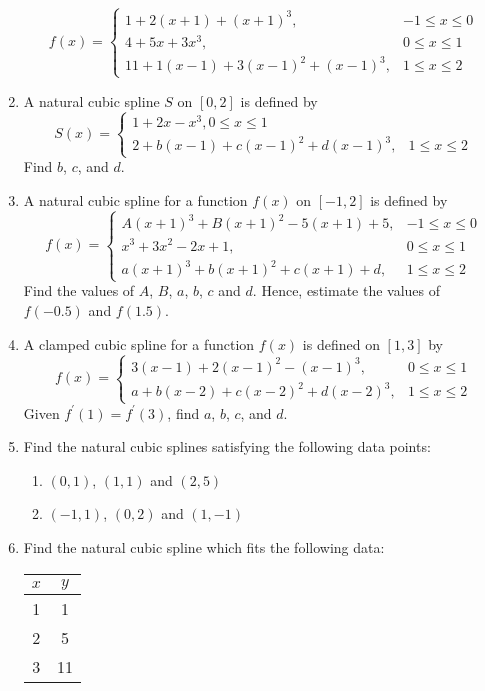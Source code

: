 \documentclass[12pt,class=book,crop=false]{standalone}
\begin{document}
\begin{enumerate}
	\[
		f(x)=\begin{cases}
			1+2(x+1)+(x+1)^3, &-1 \leq x \leq 0\\
			4+5x+3x^3, &0 \leq x \leq 1\\
			11+1(x-1)+3(x-1)^2+(x-1)^3, &1 \leq x \leq 2
		\end{cases}
	\]
	\item A natural cubic spline $ S $ on $ [0, 2] $ is defined by
	\[
		S(x)=\begin{cases}
			1+2x-x^3, 0 \leq x \leq 1\\
			2+b(x-1)+c(x-1)^2+d(x-1)^3, &1 \leq x \leq 2
		\end{cases}
	\]
	Find $ b $, $ c $, and $ d $.
	\item A natural cubic spline for a function $ f(x) $ on $ [-1, 2] $ is defined by
	\[
		f(x)=\begin{cases}
			A(x+1)^3+B(x+1)^2-5(x+1)+5, &-1 \leq x \leq 0\\
			x^3+3x^2-2x+1, &0 \leq x \leq 1\\
			a(x+1)^3+b(x+1)^2+c(x+1)+d, &1 \leq x \leq 2
		\end{cases}
	\]
	Find the values of $ A $, $ B $, $ a $, $ b $, $ c $ and $ d $.
	Hence, estimate the values of $ f(-0.5) $ and $ f(1.5) $.
	\item A clamped cubic spline for a function $ f(x) $ is defined on $ [1, 3] $ by
	\[
		f(x)=\begin{cases}
			3(x-1)+2(x-1)^2-(x-1)^3, &0 \leq x \leq 1\\
			a+b(x-2)+c(x-2)^2+d(x-2)^3,& 1 \leq x \leq 2
		\end{cases}
	\]
	Given $ f^{'}(1)=f^{'}(3) $, find $ a $, $ b $, $ c $, and $ d $.
	\item Find the natural cubic splines satisfying the following data points:
	\begin{enumerate}
		\item $ (0,1) $, $ (1,1) $ and $ (2,5) $
		\item $ (-1,1) $, $ (0,2) $ and $ (1,-1) $
	\end{enumerate}
	\item Find the natural cubic spline which fits the following data:
	\begin{table}[H]
		\centering
		\begin{tabular}{cc}
			\toprule
			$ x $	&
			$ y $	\\\midrule
			1	&
			1	\\
			2	&
			5	\\
			3	&
			11	\\

\end{tabular}
\end{table}
\end{enumerate}
\end{document}
